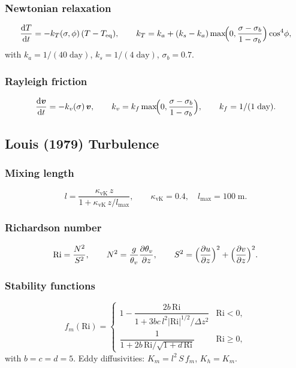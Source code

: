 \documentclass[11pt,a4paper]{article}
\newcommand{\dd}{\mathrm{d}}
\newcommand{\pp}{\partial}
\begin{document}
\subsubsection{Newtonian relaxation}
\begin{equation}
  \frac{\dd T}{\dd t} = -k_T(\sigma,\phi)\,(T-T_{\mathrm{eq}}), \qquad
  k_T = k_a + (k_s-k_a)\max\!\Bigl(0,\frac{\sigma-\sigma_b}{1-\sigma_b}\Bigr)\cos^4\!\phi,
\end{equation}
with $k_a=1/(40\;\text{day})$, $k_s=1/(4\;\text{day})$, $\sigma_b=0.7$.

\subsubsection{Rayleigh friction}
\begin{equation}
  \frac{\dd\bm v}{\dd t} = -k_v(\sigma)\,\bm v, \qquad
  k_v = k_f\max\!\Bigl(0,\frac{\sigma-\sigma_b}{1-\sigma_b}\Bigr), \qquad k_f=1/(1\;\text{day}).
\end{equation}

\subsection{Louis (1979) Turbulence}

\subsubsection{Mixing length}
\begin{equation}
  l = \frac{\kappa_{\mathrm{vK}}\,z}{1+\kappa_{\mathrm{vK}}\,z/l_{\max}}, \qquad \kappa_{\mathrm{vK}}=0.4,\quad l_{\max}=100\;\text{m}.
\end{equation}

\subsubsection{Richardson number}
\begin{equation}
  \mathrm{Ri} = \frac{N^2}{S^2}, \qquad
  N^2 = \frac{g}{\theta_v}\frac{\pp\theta_v}{\pp z}, \qquad
  S^2 = \Bigl(\frac{\pp u}{\pp z}\Bigr)^2+\Bigl(\frac{\pp v}{\pp z}\Bigr)^2.
\end{equation}

\subsubsection{Stability functions}
\begin{equation}
  f_m(\mathrm{Ri}) = \begin{cases}
    1-\dfrac{2b\,\mathrm{Ri}}{1+3bc\,l^2|\mathrm{Ri}|^{1/2}/\Delta z^2} & \mathrm{Ri}<0,\\[6pt]
    \dfrac{1}{1+2b\,\mathrm{Ri}/\sqrt{1+d\,\mathrm{Ri}}} & \mathrm{Ri}\ge 0,
  \end{cases}
\end{equation}
with $b=c=d=5$.  Eddy diffusivities: $K_m=l^2\,S\,f_m$, $K_h=K_m$.
\end{document}
